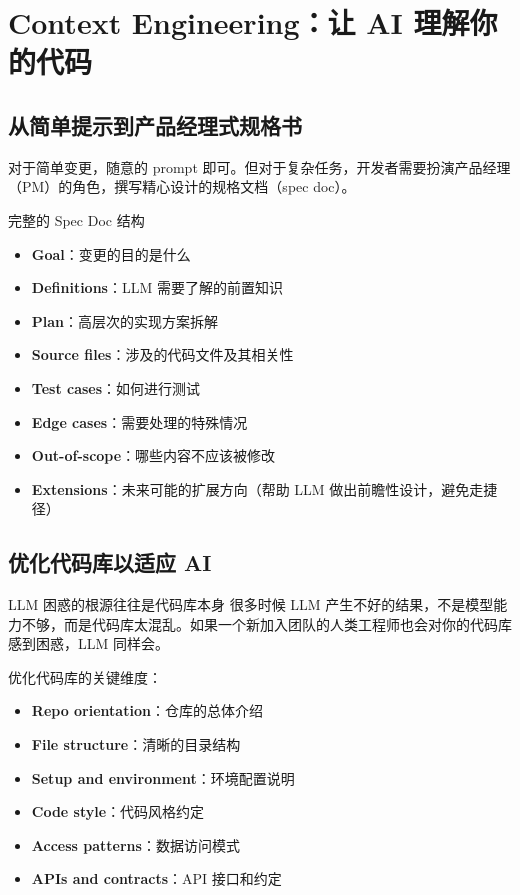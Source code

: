 \section{Context Engineering：让 AI 理解你的代码}

\subsection{从简单提示到产品经理式规格书}

对于简单变更，随意的 prompt 即可。但对于复杂任务，开发者需要扮演产品经理（PM）的角色，撰写精心设计的规格文档（spec doc）。

\begin{importantbox}{完整的 Spec Doc 结构}
\begin{itemize}
    \item \textbf{Goal}：变更的目的是什么
    \item \textbf{Definitions}：LLM 需要了解的前置知识
    \item \textbf{Plan}：高层次的实现方案拆解
    \item \textbf{Source files}：涉及的代码文件及其相关性
    \item \textbf{Test cases}：如何进行测试
    \item \textbf{Edge cases}：需要处理的特殊情况
    \item \textbf{Out-of-scope}：哪些内容不应该被修改
    \item \textbf{Extensions}：未来可能的扩展方向（帮助 LLM 做出前瞻性设计，避免走捷径）
\end{itemize}
\end{importantbox}

\subsection{优化代码库以适应 AI}

\begin{warningbox}{LLM 困惑的根源往往是代码库本身}
很多时候 LLM 产生不好的结果，不是模型能力不够，而是代码库太混乱。如果一个新加入团队的人类工程师也会对你的代码库感到困惑，LLM 同样会。
\end{warningbox}

优化代码库的关键维度：
\begin{itemize}
    \item \textbf{Repo orientation}：仓库的总体介绍
    \item \textbf{File structure}：清晰的目录结构
    \item \textbf{Setup and environment}：环境配置说明
    \item \textbf{Code style}：代码风格约定
    \item \textbf{Access patterns}：数据访问模式
    \item \textbf{APIs and contracts}：API 接口和约定
\end{itemize}

